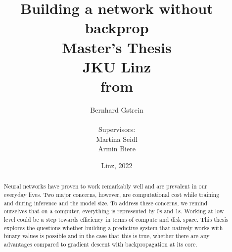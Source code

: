 \documentclass[a4paper,12pt]{article}
\begin{document}
\usetikzlibrary{patterns}

%
    \title{Building a network without backprop\\
    \vspace{2em}
    Master's Thesis\\
    \vspace{2em}
    JKU Linz\\
    \vspace{1.5em}
    from}

    \author{
 	\LARGE Bernhard Gstrein\\
 	\vspace{.5em} \\
 	Supervisors:\\
 	Martina Seidl\\
 	Armin Biere\\
 	\vspace{1em}
	}
    
\date{Linz, 2022}

\maketitle
   
\begin{abstract}
\noindent Neural networks have proven to work remarkably well and are prevalent in our everyday lives. Two major concerns, however, are computational cost while training and during inference and the model size. To address these concerns, we remind ourselves that on a computer, everything is represented by 0s and 1s. Working at low level could be a step towards efficiency in terms of compute and disk space. This thesis explores the questions whether building a predictive system that natively works with binary values is possible and in the case that this is true, whether there are any advantages compared to gradient descent with backpropagation at its core.
\end{abstract}
   
\newpage
   
\tableofcontents
 
\newpage
    









\end{document}
